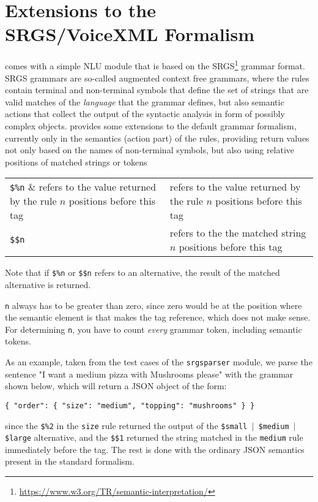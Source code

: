 \section{Extensions to the SRGS/VoiceXML Formalism} \label{sec:srgs}
\vonda comes with a simple NLU module that is based on the
SRGS\footnote{\url{ https://www.w3.org/TR/semantic-interpretation/}}
grammar format. SRGS grammars are so-called augmented context free
grammars, where the rules contain terminal and non-terminal symbols
that define the set of strings that are valid matches of the
\emph{language} that the grammar defines, but also semantic actions
that collect the \textrm{output} of the syntactic analysis in form of
possibly complex objects.  \vonda provides some extensions to the
default grammar formalism, currently only in the semantics (action
part) of the rules, providing return values not only based on the names of non-terminal symbols, but also using relative positions of matched strings or tokens

\vspace*{1ex}
\begin{tabular}{ll}
\verb|$%n| & refers to the value returned by the rule $n$ positions before this tag\\
\verb|$$n| & refers to the the matched string $n$ positions before this tag\\
\end{tabular}
\vspace*{1ex}

Note that if \verb|$%n| or \verb|$$n| refers to an alternative, the result of the matched alternative is returned.

\texttt{n} always has to be greater than zero, since zero would be at the position
where the semantic element is that makes the tag reference, which does not make
sense. For determining \texttt{n}, you have to count \emph{every} grammar token,
including semantic tokens.

As an example, taken from the test cases of the \texttt{srgsparser}
module, we parse the sentence "I want a medium pizza with Mushrooms
please" with the grammar shown below, which will return a JSON object
of the form:

\vspace*{1ex}
\verb|{ "order": { "size": "medium", "topping": "mushrooms" } }|
\vspace*{1ex}

since the \verb|$%2| in the \texttt{size} rule returned the output of the \texttt{\$small $\vert$ \$medium $\vert$ \$large} alternative, and the \verb|$$1| returned the string matched in the \texttt{medium} rule immediately before the tag. The rest is done with the ordinary JSON semantics present in the standard formalism.

